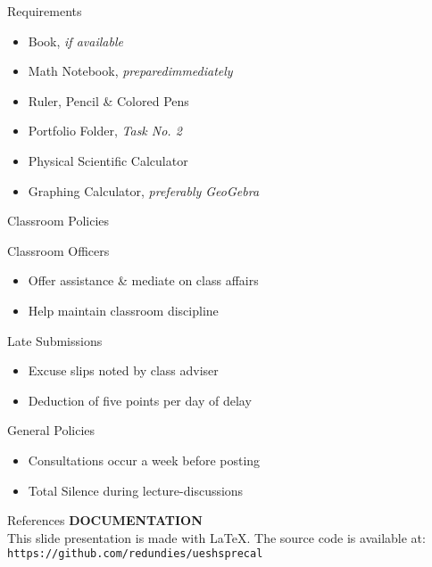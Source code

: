 \documentclass[14pt,aspectratio=169]{beamer}
\begin{document}
\begin{frame}{Requirements}
 \begin{itemize}
  \item Book, \textit{if available}
  \item Math Notebook, \textit{preparedimmediately}
  \item Ruler, Pencil \& Colored Pens
  \item Portfolio Folder, \textit{Task No. 2}
  \item Physical Scientific Calculator
  \item Graphing Calculator, \textit{preferably GeoGebra}
 \end{itemize}

\end{frame}



\begin{frame}{Classroom Policies}
 \begin{block}{Classroom Officers}
  \begin{itemize}
   \item Offer assistance \& mediate on class affairs
   \item Help maintain classroom discipline
  \end{itemize}

 \end{block}

 \begin{block}{Late Submissions}
  \begin{itemize}
   \item Excuse slips noted by class adviser
   \item Deduction of five points per day of delay
  \end{itemize}

 \end{block}

 \begin{alertblock}{General Policies}
  \begin{itemize}
   \item Consultations occur a week before posting
   \item Total Silence during lecture-discussions
  \end{itemize}

 \end{alertblock}



\end{frame}

\begin{frame}{References}
\textbf{DOCUMENTATION}\\
 This slide presentation is made with {\textrm \LaTeX}.
 The source code is available at:
 \texttt{https://github.com/redundies/ueshsprecal}
\end{frame}
\end{document}
